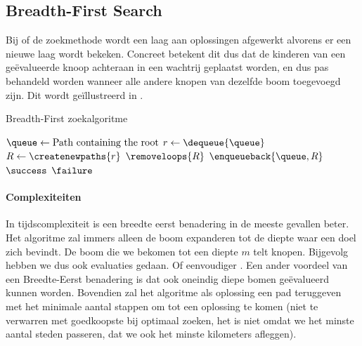 \subsection{Breadth-First Search}
Bij  of de  zoekmethode wordt een laag aan oplossingen afgewerkt alvorens er een nieuwe laag wordt bekeken. Concreet betekent dit dus dat de kinderen van een ge\"evalueerde knoop achteraan in een wachtrij geplaatst worden, en dus pas behandeld worden wanneer alle andere knopen van dezelfde boom toegevoegd zijn. Dit wordt ge\"illustreerd in .
\begin{algorithm}[htb]                      %
\caption{Breadth-First zoekalgoritme}          %
\label{alg:breadthFirst}                           %
\begin{algorithmic}[1]                    %
\STATE $\queue\leftarrow\mbox{Path containing the root}$
\WHILE{$\notempty{\queue}\wedge\neg\goalreached{\queue}$}
\STATE $r\leftarrow\dequeue{\queue}$
\STATE $R\leftarrow\createnewpaths{r}$
\STATE $\removeloops{R}$
\STATE $\enqueueback{\queue,R}$
\ENDWHILE
\IF{$\goalreached{\queue}$}
\RETURN $\success$
\ELSE
\RETURN $\failure$
\ENDIF
\end{algorithmic}
\end{algorithm}
\paragraph{Complexiteiten}
In tijdscomplexiteit is een breedte eerst benadering in de meeste gevallen beter. Het algoritme zal immers alleen de boom expanderen tot de diepte waar een doel zich bevindt. De boom die we bekomen tot een diepte $m$ telt  knopen. Bijgevolg hebben we dus ook  evaluaties gedaan. Of eenvoudiger . Een ander voordeel van een Breedte-Eerst benadering is dat ook oneindig diepe bomen ge\"evalueerd kunnen worden. Bovendien zal het algoritme als oplossing een pad teruggeven met het minimale aantal stappen om tot een oplossing te komen (niet te verwarren met goedkoopste bij optimaal zoeken, het is niet omdat we het minste aantal steden passeren, dat we ook het minste kilometers afleggen).
